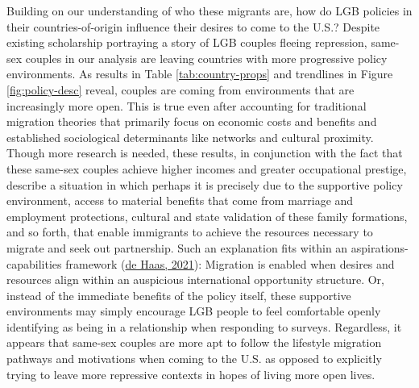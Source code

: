 \documentclass[
  11pt,
]{article}
\begin{document}
Building on our understanding of who these migrants are, how do LGB policies in their countries-of-origin influence their desires to come to the U.S.? Despite existing scholarship portraying a story of LGB couples fleeing repression, same-sex couples in our analysis are leaving countries with more progressive policy environments. As results in Table \ref{tab:country-props} and trendlines in Figure \ref{fig:policy-desc} reveal, couples are coming from environments that are increasingly more open. This is true even after accounting for traditional migration theories that primarily focus on economic costs and benefits and established sociological determinants like networks and cultural proximity. Though more research is needed, these results, in conjunction with the fact that these same-sex couples achieve higher incomes and greater occupational prestige, describe a situation in which perhaps it is precisely due to the supportive policy environment, access to material benefits that come from marriage and employment protections, cultural and state validation of these family formations, and so forth, that enable immigrants to achieve the resources necessary to migrate and seek out partnership. Such an explanation fits within an aspirations-capabilities framework (\protect\hyperlink{ref-dehaas_2021}{de Haas, 2021}): Migration is enabled when desires and resources align within an auspicious international opportunity structure. Or, instead of the immediate benefits of the policy itself, these supportive environments may simply encourage LGB people to feel comfortable openly identifying as being in a relationship when responding to surveys. Regardless, it appears that same-sex couples are more apt to follow the lifestyle migration pathways and motivations when coming to the U.S. as opposed to explicitly trying to leave more repressive contexts in hopes of living more open lives.
\end{document}
